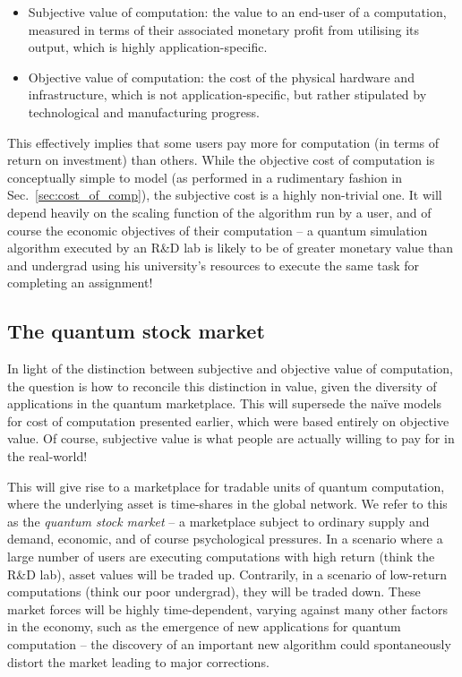 \begin{itemize}
\item Subjective value of computation: the value to an end-user of a computation, measured in terms of their associated monetary profit from utilising its output, which is highly application-specific.
\item Objective value of computation: the cost of the physical hardware and infrastructure, which is not application-specific, but rather stipulated by technological and manufacturing progress.
\end{itemize}

This effectively implies that some users pay more for computation (in terms of return on investment) than others. While the objective cost of computation is conceptually simple to model (as performed in a rudimentary fashion in Sec.~\ref{sec:cost_of_comp}), the subjective cost is a highly non-trivial one. It will depend heavily on the scaling function of the algorithm run by a user, and of course the economic objectives of their computation -- a quantum simulation algorithm executed by an R\&D lab is likely to be of greater monetary value than and undergrad using his university's resources to execute the same task for completing an assignment!

%
%

\subsection{The quantum stock market}

In light of the distinction between subjective and objective value of computation, the question  is how to reconcile this distinction in value, given the diversity of applications in the quantum marketplace. This will supersede the na\"ive models for cost of computation presented earlier, which were based entirely on objective value. Of course, subjective value is what people are actually willing to pay for in the real-world!

This will give rise to a marketplace for tradable units of quantum computation, where the underlying asset is time-shares in the global network. We refer to this as the \textit{quantum stock market} -- a marketplace subject to ordinary supply and demand, economic, and of course psychological pressures. In a scenario where a large number of users are executing computations with high return (think the R\&D lab), asset values will be traded up. Contrarily, in a scenario of low-return computations (think our poor undergrad), they will be traded down. These market forces will be highly time-dependent, varying against many other factors in the economy, such as the emergence of new applications for quantum computation -- the discovery of an important new algorithm could spontaneously distort the market leading to major corrections.

